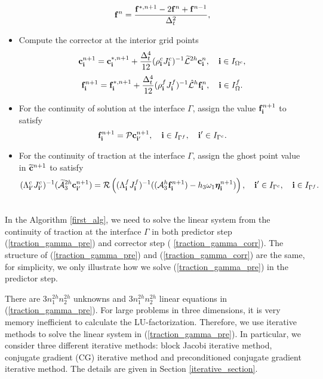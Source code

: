 \begin{breakablealgorithm}
\begin{itemize}
{\begin{equation*}
			{\bf f}^{n} = \frac{{\bf f}^{*,n+1}-2{\bf f}^{n}+{\bf f}^{n-1}}{\Delta^2_t},
			\end{equation*}
		}
		\item{Compute the corrector at the interior grid points
			\[{\bf c}^{n+1}_{\bf i} = {\bf c}^{*,n+1}_{\bf i} + \frac{\Delta_t^4}{12}(\rho^{c}_{\bf i}J^c_{\bf i})^{-1}\widetilde{\mathcal{L}}^{2h}{\bf{c}}^{n}_{\bf i},\quad {\bf i}\in I_{\Omega^c},\]
			\[{\bf f}^{n+1}_{\bf i} = {\bf f}^{*,n+1}_{\bf i} + \frac{\Delta_t^4}{12}(\rho^{f}_{\bf i}J^f_{\bf i})^{-1}\hat{\mathcal{L}}^{h}{\bf{f}}^{n}_{\bf i},\quad {\bf i}\in I_\Omega^f.\]
		}
		\item{For the continuity of solution at the interface $\Gamma$, assign the value ${\bf f}^{n+1}_{\bf i}$ to satisfy
			\begin{equation*}
			{\bf f}^{n+1}_{\bf i} = {\mathcal{P}}{\bf c}^{n+1}_{{\bf i}'}, \quad {\bf i}\in I_{\Gamma^f},\quad {{\bf i}'}\in I_{\Gamma^c}.
			\end{equation*}
		}
		\item{For the continuity of traction at the interface $\Gamma$, assign the ghost point value in $\widetilde{\bf c}^{n+1}$ to satisfy
			\begin{equation}\label{traction_gamma_corr}
			({\Lambda}^{c}_{{\bf i}'}{J}_{{\bf i}'}^{c})^{-1}(\wt{\mathcal{A}}_3^{2h}{\bf c}^{n+1}_{{\bf i}'})
			= {\mathcal{R}}\left(({\Lambda}^{f}_{\bf i}{ J}^f_{\bf i})^{-1}((\mathcal{A}_3^h{\bf f}^{n+1}_{\bf i})-h_3\omega_1{\bm \eta}^{n+1}_{\bf i})\right), \quad {{\bf i}'}\in I_{\Gamma^c}, \quad {\bf i}\in I_{\Gamma^f}.
			\end{equation}
		}
	\end{itemize}
\end{breakablealgorithm}
~\\

In the Algorithm \ref{first_alg}, we need to solve the linear system from the continuity of traction at the interface $\Gamma$ in both predictor step (\ref{traction_gamma_pre}) and corrector step (
\ref{traction_gamma_corr}). The structure of (\ref{traction_gamma_pre}) and (\ref{traction_gamma_corr}) are the same, for simplicity, we only illustrate how we solve (\ref{traction_gamma_pre}) in the predictor step.

There are $3n_1^{2h}n_2^{2h}$ unknowns and $3n_1^{2h}n_2^{2h}$ linear equations in (\ref{traction_gamma_pre}). For large problems in three dimensions, it is very memory inefficient to calculate the LU-factorization. Therefore, we use iterative methods to solve the linear system in (\ref{traction_gamma_pre}). In particular, we consider three different iterative methods: block Jacobi iterative method, conjugate gradient (CG) iterative method and preconditioned conjugate gradient iterative method. The details are given in Section \ref{iterative_section}.